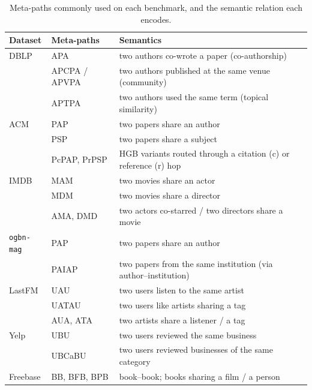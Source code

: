 \begin{table}[htbp]
\centering
\small
\caption{Meta-paths commonly used on each benchmark, and the semantic relation each encodes.}
\label{p2:tab:metapaths}
\begin{tabular}{llp{7.6cm}}
\toprule
Dataset & Meta-paths & Semantics \\
\midrule
DBLP & APA & two authors co-wrote a paper (co-authorship) \\
     & APCPA / APVPA & two authors published at the same venue (community) \\
     & APTPA & two authors used the same term (topical similarity) \\
\midrule
ACM  & PAP & two papers share an author \\
     & PSP & two papers share a subject \\
     & PcPAP, PrPSP & HGB variants routed through a citation (c) or reference (r) hop \\
\midrule
IMDB & MAM & two movies share an actor \\
     & MDM & two movies share a director \\
     & AMA, DMD & two actors co-starred / two directors share a movie \\
\midrule
\texttt{ogbn-mag} & PAP & two papers share an author \\
     & PAIAP & two papers from the same institution (via author--institution) \\
\midrule
LastFM & UAU & two users listen to the same artist \\
     & UATAU & two users like artists sharing a tag \\
     & AUA, ATA & two artists share a listener / a tag \\
\midrule
Yelp & UBU & two users reviewed the same business \\
     & UBCaBU & two users reviewed businesses of the same category \\
\midrule
Freebase & BB, BFB, BPB & book--book; books sharing a film / a person \\
\bottomrule
\end{tabular}
\end{table}


